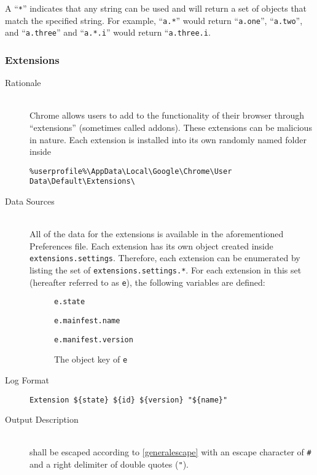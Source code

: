 A ``\texttt{*}'' indicates that any string can be used and will return a set of
objects that match the specified string.  For example, ``\texttt{a.*}'' would
return ``\texttt{a.one}'', ``\texttt{a.two}'', and ``\texttt{a.three}'' and
``\texttt{a.*.i}'' would return ``\texttt{a.three.i}.

\subsubsection{Extensions}
\begin{description}
\item[Rationale] \hfill \\
Chrome allows users to add to the functionality of their browser through
``extensions'' (sometimes called addons).  These extensions can be malicious in
nature.   Each extension is installed into its own randomly named folder inside
\vspace{-\baselineskip}
\begin{verbatim}
%userprofile%\AppData\Local\Google\Chrome\User Data\Default\Extensions\
\end{verbatim}
\item[Data Sources] \hfill \\
All of the data for the extensions is available in the aforementioned
Preferences file.  Each extension has its own object created inside
\texttt{extensions.settings}.  Therefore, each extension can be enumerated by
listing the set of \texttt{extensions.settings.*}.  For each extension in this
set (hereafter referred to as \texttt{e}), the following variables are defined:
\begin{description}
\item[] \texttt{e.state}
\item[] \texttt{e.mainfest.name}
\item[] \texttt{e.manifest.version}
\item[] The object key of \texttt{e}
\end{description}
\item[Log Format] \hfill 
\vspace{-\baselineskip}
\begin{verbatim}
Extension ${state} ${id} ${version} "${name}"
\end{verbatim}
\item[Output Description] \hfill \\
 shall be escaped according to \ref{generalescape} with an escape
character of \verb|#| and a right delimiter of double quotes (\verb|"|). 


\end{description}
